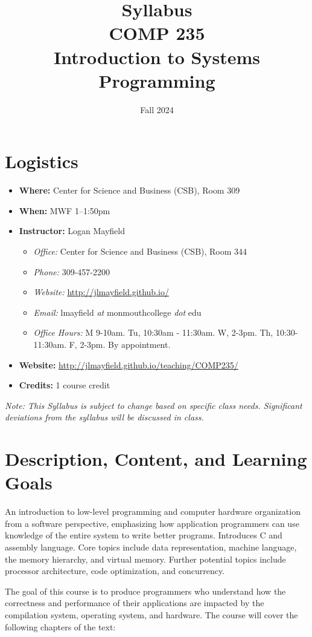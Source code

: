 \documentclass[10pt]{article}
\title{Syllabus \\ COMP 235 \\ Introduction to Systems Programming}
\author{  }
\date{Fall 2024}
\begin{document}
\maketitle

\section{Logistics}
\begin{itemize}
\item \textbf{Where: } Center for Science and Business (CSB), Room 309
\item \textbf{When: } MWF 1--1:50pm
\item \textbf{Instructor: } Logan Mayfield
\begin{itemize}
\item \textit{Office: } Center for Science and Business (CSB), Room 344
\item \textit{Phone: } 309-457-2200 %
\item \textit{Website: } \url{http://jlmayfield.github.io/}
\item \textit{Email: } lmayfield \textit{at} monmouthcollege \textit{dot} edu
\item \textit{Office Hours: }  M 9-10am. Tu, 10:30am - 11:30am. W, 2-3pm. Th, 10:30-11:30am. F, 2-3pm. By appointment.
\end{itemize}
\item \textbf{Website: } \url{http://jlmayfield.github.io/teaching/COMP235/}
\item \textbf{Credits: } 1 course credit
\end{itemize}
\emph{Note: This Syllabus is subject to change based on specific class needs. Significant deviations from the syllabus will be discussed in class.}


\section{Description, Content, and Learning Goals}

An introduction to low-level programming and computer hardware
organization from a software perspective, emphasizing how application
programmers can use knowledge of the entire system to write better
programs. Introduces C and assembly language. Core topics include data
representation, machine language, the memory hierarchy, and virtual
memory. Further potential topics include processor architecture, code
optimization, and concurrency.

The goal of this course is to produce programmers who understand how
the correctness and performance of their applications are impacted by
the compilation system, operating system, and hardware. The course will
cover the following chapters of the text:
\end{document}
